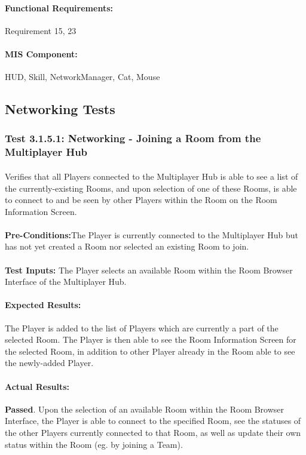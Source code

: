 \documentclass{article}
\begin{document}
     \paragraph{Functional Requirements:} Requirement 15, 23
    \paragraph{MIS Component:} HUD, Skill, NetworkManager, Cat, Mouse
    
    \subsection{Networking Tests}
     \subsubsection{Test 3.1.5.1: Networking - Joining a Room from the Multiplayer Hub}
    \paragraph{} Verifies that all Players connected to the Multiplayer Hub is able to see a list of the currently-existing Rooms, and upon selection of one of these Rooms, is able to connect to and be seen by other Players within the Room on the Room Information Screen.
    \paragraph{}\textbf{Pre-Conditions:}The Player is currently connected to the Multiplayer Hub but has not yet created a Room nor selected an existing Room to join.
    \paragraph{}\textbf{Test Inputs:} The Player selects an available Room within the Room Browser Interface of the Multiplayer Hub.
    \paragraph{Expected Results:} The Player is added to the list of Players which are currently a part of the selected Room. The Player is then able to see the Room Information Screen for the selected Room, in addition to other Player already in the Room able to see the newly-added Player. 
    \paragraph{Actual Results:} \textbf{Passed}. Upon the selection of an available Room within the Room Browser Interface, the Player is able to connect to the specified Room, see the statuses of the other Players currently connected to that Room, as well as update their own status within the Room (eg. by joining a Team).
\end{document}

